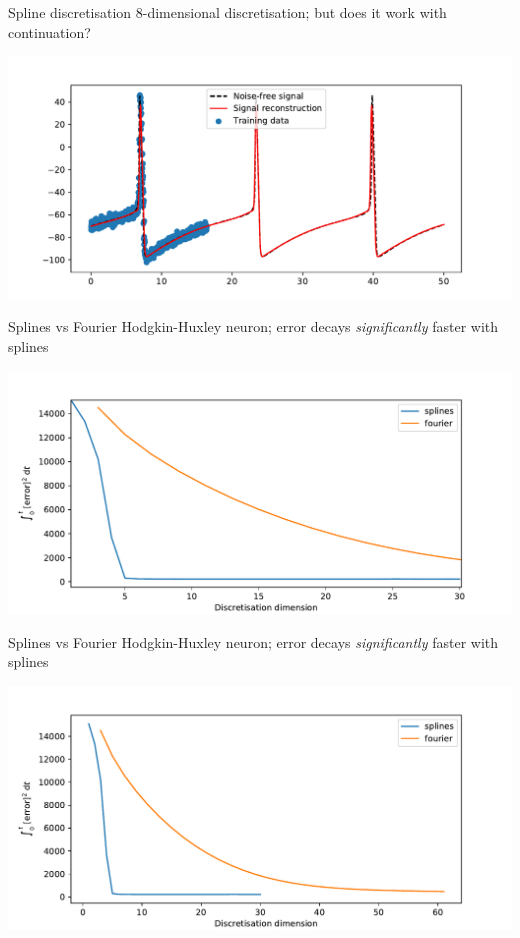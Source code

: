 \documentclass[presentation]{beamer}
\begin{document}
\begin{frame}[label={sec:org39751f1}]{Spline discretisation}
8-dimensional discretisation; but does it work with continuation?
\begin{center}
\includegraphics[width=.9\linewidth]{./HHdisc.pdf}
\end{center}
\end{frame}
\begin{frame}[label={sec:org4b4970f}]{Splines vs Fourier}
Hodgkin-Huxley neuron; error decays \emph{significantly} faster with splines
\begin{center}
\includegraphics[width=.9\linewidth]{./HHerror2.pdf}
\end{center}
\end{frame}

\begin{frame}[label={sec:org16ec93f}]{Splines vs Fourier}
Hodgkin-Huxley neuron; error decays \emph{significantly} faster with splines
\begin{center}
\includegraphics[width=.9\linewidth]{./HHerror.pdf}
\end{center}
\end{frame}
\end{document}
